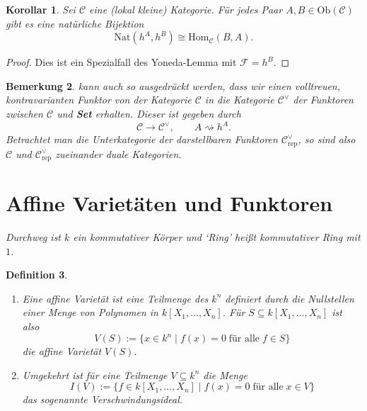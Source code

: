 \documentclass[a4paper, 11pt]{scrartcl}
\newcommand{\Hom}{\text{Hom}}
\newcommand{\Ob}{\text{Ob}}
\theoremstyle{basicstyle}
\newtheorem{definition}{Definition}[section]
\newtheorem{bemerkung}[definition]{Bemerkung}
\newtheorem{korollar}[definition]{Korollar}
\begin{document}
    \begin{korollar}\label{kor:1}
        Sei \(\mathcal{C}\) eine (lokal kleine) Kategorie.
        Für jedes Paar \(A, B \in \Ob(\mathcal{C})\) gibt es eine natürliche Bijektion
        \[\text{Nat}(h^A, h^B) \cong \Hom_{\mathcal{C}}(B, A).\]
    \end{korollar}
    \begin{proof}
        Dies ist ein Spezialfall des Yoneda-Lemma mit \(\mathcal{F} = h^B\).
    \end{proof}

    \begin{bemerkung}
         kann auch so ausgedrückt werden, dass wir einen volltreuen, kontravarianten Funktor von der Kategorie \(\mathcal{C}\) in die Kategorie \(\mathcal{C}^\vee\) der Funktoren zwischen \(\mathcal{C}\) und \textbf{Set} erhalten.
        Dieser ist gegeben durch 
        \[\mathcal{C} \longrightarrow \mathcal{C}^\vee, \qquad A \rightsquigarrow h^A.\]
        Betrachtet man die Unterkategorie der darstellbaren Funktoren \(\mathcal{C}_\text{rep}^\vee\), so sind also \(\mathcal{C}\) und \(\mathcal{C}^\vee_\text{rep}\) zueinander duale Kategorien.
    \end{bemerkung}


    \section{Affine Varietäten und Funktoren}
    
    {\itshape Durchweg ist \(k\) ein kommutativer Körper und `Ring' heißt kommutativer Ring mit \(1\).}
    
    \begin{definition}
        \begin{enumerate}
            \item Eine \emph{affine Varietät} ist eine Teilmenge des \(k^n\) definiert durch die Nullstellen einer Menge von Polynomen in \(k[X_1, \ldots, X_n]\).
                Für \(S \subseteq k[X_1, \ldots, X_n]\) ist also 
                \[V(S) := \{x \in k^n \;\vert\; f(x) = 0 \; \text{für alle}\; f \in S\}\]
                die affine Varietät \(V(S)\).

            \item Umgekehrt ist für eine Teilmenge \(V \subseteq k^n\) die Menge
                \[I(V) := \{f \in k[X_1, \ldots, X_n] \;\vert\; f(x) = 0 \;\text{für alle}\; x \in V\}\]
                das sogenannte \emph{Verschwindungsideal}.
        \end{enumerate}
    \end{definition}
\end{document}
